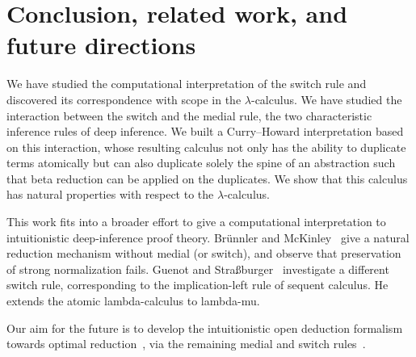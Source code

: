 \documentclass[a4paper,UKenglish,cleveref, autoref]{lipics-v2019}
\begin{document}
\section{Conclusion, related work, and future directions}
\label{chap:conc}


We have studied the computational interpretation of the switch rule and discovered its correspondence with scope in the $\lambda$-calculus. We have studied the interaction between the switch and the medial rule, the two characteristic inference rules of deep inference. We built a Curry--Howard interpretation based on this interaction, whose resulting calculus not only has the ability to duplicate terms atomically but can also duplicate solely the spine of an abstraction such that beta reduction can be applied on the duplicates. We show that this calculus has natural properties with respect to the $\lambda$-calculus.

This work fits into a broader effort to give a computational interpretation to intuitionistic deep-inference proof theory. Br\"unnler and McKinley~\cite{Brunnler-McKinley-2008} give a natural reduction mechanism without medial (or switch), and observe that preservation of strong normalization fails. Guenot and Stra\ss burger~\cite{Guenot-Strassburger-2014} investigate a different switch rule, corresponding to the implication-left rule of sequent calculus. He~\cite{He-2018} extends the atomic lambda-calculus to lambda-mu.

Our aim for the future is to develop the intuitionistic open deduction formalism towards optimal reduction~\cite{Levy-1980,Lamping-1990,Asperti-Guerrini-1998}, via the remaining medial and switch rules~\cite{Tiu-2006}.
\end{document}
